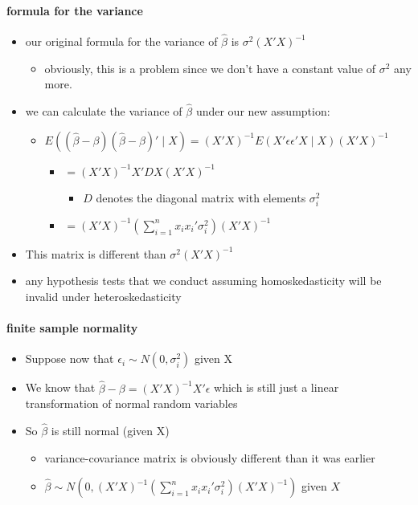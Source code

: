 \paragraph{formula for the variance}
\begin{itemize}
\item our original formula for the variance of $\hat\beta$ is
        $\sigma^2 (X'X)^{-1}$
\begin{itemize}
\item obviously, this is a problem since we don't have a constant
          value of $\sigma^2$ any more.
\end{itemize}
\item we can calculate the variance of $\hat\beta$ under our new
        assumption:
\begin{itemize}
\item $E((\hat\beta - \beta)(\hat\beta - \beta)' \mid X) =
          (X'X)^{-1} E(X'\epsilon \epsilon'X \mid X) (X'X)^{-1}$
\begin{itemize}
\item $= (X'X)^{-1} X'DX (X'X)^{-1}$
\begin{itemize}
\item $D$ denotes the diagonal matrix with elements $\sigma_i^2$
\end{itemize}
\item $= (X'X)^{-1} (\sum_{i=1}^n x_i x_i' \sigma_i^2)(X'X)^{-1}$
\end{itemize}
\end{itemize}
\item This matrix is different than $\sigma^2(X'X)^{-1}$
\item any hypothesis tests that we conduct assuming homoskedasticity
        will be invalid under heteroskedasticity
\end{itemize}

\paragraph{finite sample normality}
\begin{itemize}
\item Suppose now that $\epsilon_i \sim N(0, \sigma_i^2)$ given X
\item We know that $\hat\beta - \beta = (X'X)^{-1}X'\epsilon$ which
        is still just a linear transformation of normal random variables
\item So $\hat\beta$ is still normal (given X)
\begin{itemize}
\item variance-covariance matrix is obviously different than it was
          earlier
\item $\hat \beta \sim N\left(0, (X'X)^{-1} \left(\sum_{i=1}^n x_i x_i' \sigma_i^2 \right)
          (X'X)^{-1}\right)$ given $X$
\end{itemize}
\end{itemize}

